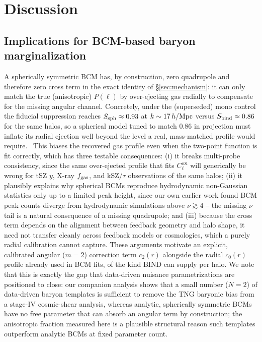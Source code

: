 \documentclass[11pt]{article}
\newcommand{\fgas}{f_{\rm gas}}
\begin{document}
\section{Discussion}\label{sec:discussion}

\subsection{Implications for BCM-based baryon marginalization}

A spherically symmetric BCM has, by construction, zero quadrupole and
therefore zero cross term in the exact identity of
\S\ref{sec:mechanism}: it can only match the true (anisotropic) $P(\ell)$
by over-ejecting gas radially to compensate for the missing angular
channel. Concretely, under the (superseded) mono control the fiducial
suppression reaches $S_{\rm sph}\approx0.93$ at $k\sim17\,h/{\rm Mpc}$
versus $S_{\rm bind}\approx0.86$ for the same halos, so a spherical model
tuned to match $0.86$ in projection must inflate its radial ejection well
beyond the level a real, mass-matched profile would require.\ %
This biases the recovered gas profile even when the two-point function is
fit correctly, which has three testable consequences: (i) it breaks
multi-probe consistency, since the same over-ejected profile that fits
$C_\ell^{\kappa\kappa}$ will generically be wrong for tSZ $y$, X-ray
$\fgas$, and kSZ/$\tau$ observations of the same halos; (ii) it plausibly
explains why spherical BCMs reproduce hydrodynamic non-Gaussian
statistics only up to a limited peak height, since our own earlier work
found BCM peak counts diverge from hydrodynamic simulations above
$\nu\gtrsim4$ \citep{lee2022} -- the missing $\nu$ tail is a natural
consequence of a missing quadrupole; and (iii) because the cross term
depends on the alignment between feedback geometry and halo shape, it
need not transfer cleanly across feedback models or cosmologies, which a
purely radial calibration cannot capture. These arguments motivate an
explicit, calibrated angular ($m=2$) correction term $c_2(r)$ alongside
the radial $c_0(r)$ profile already used in BCM fits, of the kind BIND can
supply per halo. We note that this is exactly the gap that data-driven
nuisance parametrizations are positioned to close: our companion analysis
\citep[Paper II]{bindII} shows that a small number ($N=2$) of
data-driven baryon templates is sufficient to remove the TNG baryonic
bias from a stage-IV cosmic-shear analysis, whereas analytic, spherically
symmetric BCMs have no free parameter that can absorb an angular term by
construction; the anisotropic fraction measured here is a plausible
structural reason such templates outperform analytic BCMs at fixed
parameter count.
\end{document}
